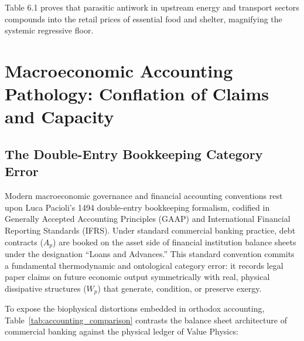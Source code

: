 \documentclass[preprint,12pt,authoryear]{elsarticle}
\theoremstyle{definition}
\begin{document}
Table 6.1 proves that parasitic antiwork in upstream energy and transport sectors compounds into the retail prices of essential food and shelter, magnifying the systemic regressive floor.

\section{Macroeconomic Accounting Pathology: Conflation of Claims and Capacity}

\subsection{The Double-Entry Bookkeeping Category Error}

Modern macroeconomic governance and financial accounting conventions rest upon Luca Pacioli's 1494 double-entry bookkeeping formalism, codified in Generally Accepted Accounting Principles (GAAP) and International Financial Reporting Standards (IFRS). Under standard commercial banking practice, debt contracts ($A_p$) are booked on the asset side of financial institution balance sheets under the designation ``Loans and Advances.'' This standard convention commits a fundamental thermodynamic and ontological category error: it records legal paper claims on future economic output symmetrically with real, physical dissipative structures ($W_p$) that generate, condition, or preserve exergy.

To expose the biophysical distortions embedded in orthodox accounting, Table~\ref{tab:accounting_comparison} contrasts the balance sheet architecture of commercial banking against the physical ledger of Value Physics:
\end{document}
